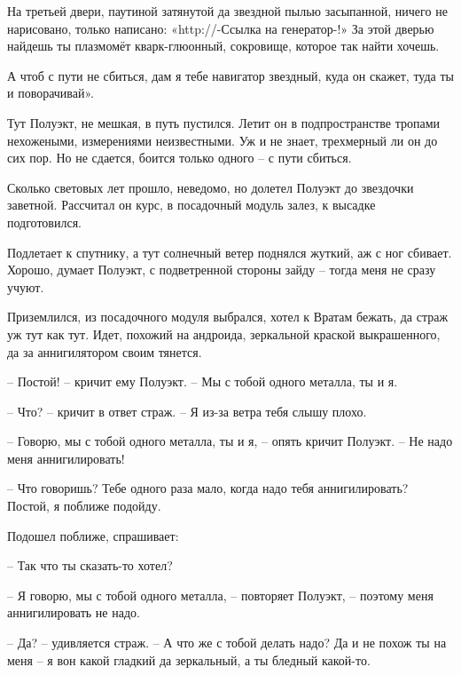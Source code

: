\documentclass[ebook,oneside,final,openright]{memoir}
\begin{document}
\par
На третьей двери, паутиной затянутой да звездной пылью засыпанной, ничего не нарисовано, только написано: «http://-Ссылка на генератор-!» За этой дверью найдешь ты плазмомёт кварк-глюонный, сокровище, которое так найти хочешь.\par
\par
А чтоб с пути не сбиться, дам я тебе навигатор звездный, куда он скажет, туда ты и поворачивай».\par
\par
Тут Полуэкт, не мешкая, в путь пустился. Летит он в подпространстве тропами нехожеными, измерениями неизвестными. Уж и не знает, трехмерный ли он до сих пор. Но не сдается, боится только одного – с пути сбиться.\par
\par
Сколько световых лет прошло, неведомо, но долетел Полуэкт до звездочки заветной. Рассчитал он курс, в посадочный модуль залез, к высадке подготовился.\par
\par
Подлетает к спутнику, а тут солнечный ветер поднялся жуткий, аж с ног сбивает. Хорошо, думает Полуэкт, с подветренной стороны зайду – тогда меня не сразу учуют. \par
\par
 Приземлился, из посадочного модуля выбрался, хотел к Вратам бежать, да страж уж тут как тут. Идет, похожий на андроида, зеркальной краской выкрашенного, да за аннигилятором своим тянется. \par
 \par
– Постой! – кричит ему Полуэкт. – Мы с тобой одного металла, ты и я. \par
– Что? – кричит в ответ страж. – Я из-за ветра тебя слышу плохо. \par
– Говорю, мы с тобой одного металла, ты и я, – опять кричит Полуэкт. – Не надо меня аннигилировать!\par
– Что говоришь? Тебе одного раза мало, когда надо тебя аннигилировать? Постой, я поближе подойду. \par
Подошел поближе, спрашивает: \par
– Так что ты сказать-то хотел? \par
– Я говорю, мы с тобой одного металла, – повторяет Полуэкт, – поэтому меня аннигилировать не надо. \par
– Да? – удивляется страж. – А что же с тобой делать надо? Да и не похож ты на меня – я вон какой гладкий да зеркальный, а ты бледный какой-то. \par
\end{document}
